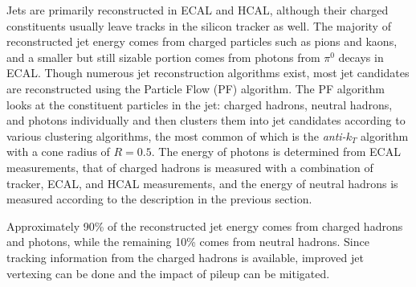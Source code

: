 Jets are primarily reconstructed in ECAL and HCAL, although their charged constituents usually leave tracks in the silicon tracker as well. The majority of reconstructed jet energy comes from charged particles such as pions and kaons, and a smaller but still sizable portion comes from photons from $\pi^0$ decays in ECAL. Though numerous jet reconstruction algorithms exist, most jet candidates are reconstructed using the Particle Flow (PF) algorithm. The PF algorithm looks at the constituent particles in the jet: charged hadrons, neutral hadrons, and photons individually and then clusters them into jet candidates according to various clustering algorithms, the most common of which is the \emph{anti-}$k_{T}$ algorithm with a cone radius of $R = 0.5$. The energy of photons is determined from ECAL measurements, that of charged hadrons is measured with a combination of tracker, ECAL, and HCAL measurements, and the energy of neutral hadrons is measured according to the description in the previous section.

Approximately 90\% of the reconstructed jet energy comes from charged hadrons and photons, while the remaining 10\% comes from neutral hadrons. Since tracking information from the charged hadrons is available, improved jet vertexing can be done and the impact of pileup can be mitigated.




